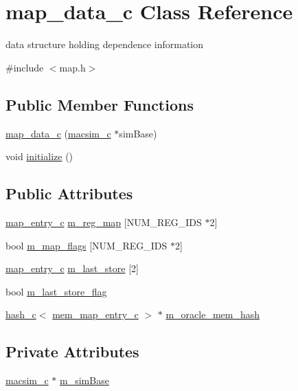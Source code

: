 \hypertarget{classmap__data__c}{
\section{map\_\-data\_\-c Class Reference}
\label{classmap__data__c}
}


data structure holding dependence information  




{\ttfamily \#include $<$map.h$>$}

\subsection*{Public Member Functions}
\begin{DoxyCompactItemize}
\item 
\hyperlink{classmap__data__c_a207c7c5d293a92fa6ff9d7c8bd342171}{map\_\-data\_\-c} (\hyperlink{classmacsim__c}{macsim\_\-c} $\ast$simBase)
\item 
void \hyperlink{classmap__data__c_a6432fa4d113cfa96f91a8b8489013490}{initialize} ()
\end{DoxyCompactItemize}
\subsection*{Public Attributes}
\begin{DoxyCompactItemize}
\item 
\hyperlink{classmap__entry__c}{map\_\-entry\_\-c} \hyperlink{classmap__data__c_a6d513b4921be0e1da6ca2360e799453a}{m\_\-reg\_\-map} \mbox{[}NUM\_\-REG\_\-IDS $\ast$2\mbox{]}
\item 
bool \hyperlink{classmap__data__c_a8ff9086064a196500af89171acf094f4}{m\_\-map\_\-flags} \mbox{[}NUM\_\-REG\_\-IDS $\ast$2\mbox{]}
\item 
\hyperlink{classmap__entry__c}{map\_\-entry\_\-c} \hyperlink{classmap__data__c_a0fdc6d2ec6990c2dcf5851280020453f}{m\_\-last\_\-store} \mbox{[}2\mbox{]}
\item 
bool \hyperlink{classmap__data__c_a43198f297f11ac7c3626469abedc194f}{m\_\-last\_\-store\_\-flag}
\item 
\hyperlink{classhash__c}{hash\_\-c}$<$ \hyperlink{classmem__map__entry__c}{mem\_\-map\_\-entry\_\-c} $>$ $\ast$ \hyperlink{classmap__data__c_a48ae320988c5045e28f10321feae64f8}{m\_\-oracle\_\-mem\_\-hash}
\end{DoxyCompactItemize}
\subsection*{Private Attributes}
\begin{DoxyCompactItemize}
\item 
\hyperlink{classmacsim__c}{macsim\_\-c} $\ast$ \hyperlink{classmap__data__c_ac4f6915212a9d8a7df898996070a18a3}{m\_\-simBase}
\end{DoxyCompactItemize}


